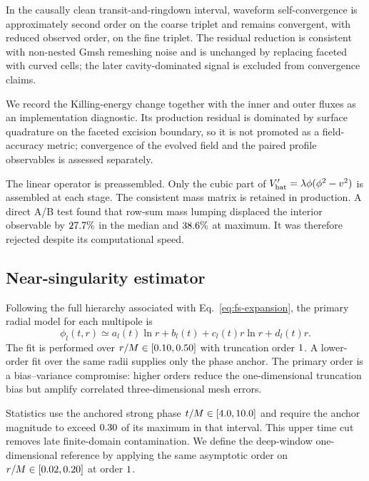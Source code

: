 \documentclass[
  aps,
  prd,
  reprint,
  superscriptaddress,
  nofootinbib,
  longbibliography
]{revtex4-2}
\begin{document}
In the causally clean transit-and-ringdown interval, waveform
self-convergence is approximately second order on the coarse triplet and
remains convergent, with reduced observed order, on the fine triplet.  The
residual reduction is consistent with non-nested Gmsh remeshing noise and is
unchanged by replacing faceted with curved cells; the later cavity-dominated
signal is excluded from convergence claims.

We record the Killing-energy change together with the inner and outer fluxes
as an implementation diagnostic.  Its production residual is dominated by
surface quadrature on the faceted excision boundary, so it is not promoted as
a field-accuracy metric; convergence of the evolved field and the paired
profile observables is assessed separately.

The linear operator is preassembled.  Only the cubic part of
$V'_{\rm hat}=\lambda\phi(\phi^2-v^2)$ is assembled at each stage.
The consistent mass matrix is retained in production.
A direct A/B test found that row-sum mass lumping displaced the interior
observable by $27.7\%$ in the median and $38.6\%$ at
maximum.  It was therefore rejected despite its computational speed.

\subsection{Near-singularity estimator}

Following the full hierarchy associated with Eq.~\eqref{eq:fs-expansion},
the primary radial model for each multipole is
\begin{equation}
  \phi_l(t,r)
  \simeq a_l(t)\ln r+b_l(t)
  +c_l(t)r\ln r+d_l(t)r .
  \label{eq:o1-fit}
\end{equation}
The fit is performed over
$r/M\in[0.10,0.50]$ with truncation order
$1$.  A lower-order fit over the same radii supplies only
the phase anchor.  The primary order is a bias--variance compromise: higher
orders reduce the one-dimensional truncation bias but amplify correlated
three-dimensional mesh errors.

Statistics use the anchored strong phase
$t/M\in[4.0,10.0]$ and require the anchor magnitude to
exceed $0.30$ of its maximum in that interval.  This upper time
cut removes late finite-domain contamination.  We define the deep-window
one-dimensional reference by applying the same asymptotic order on
$r/M\in[0.02,0.20]$ at order
$1$.
\end{document}
